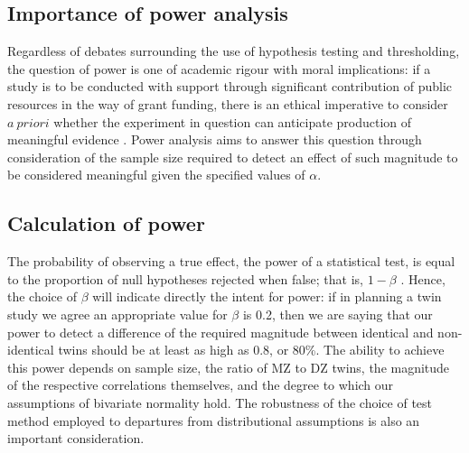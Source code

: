 \subsection{Importance of power analysis}
Regardless of debates surrounding the use of hypothesis testing and thresholding, the question of power is one of academic rigour with moral implications: if a study is to be conducted with support through significant contribution of public resources in the way of grant funding, there is an ethical imperative to consider $a \ priori$ whether the experiment in question can anticipate production of meaningful evidence \cite{Freiman1978,Cohen1988}.  Power analysis aims to answer this question through consideration of the sample size required to detect an effect of such magnitude to be considered meaningful given the specified values of $\alpha$.  

\subsection{Calculation of power}
The probability of observing a true effect, the power of a statistical test, is equal to the proportion of null hypotheses rejected when false; that is, $1 - \beta$ \cite{Cohen1988}.  Hence, the choice of $\beta$ will indicate directly the intent for power: if in planning a twin study we agree an appropriate value for $\beta$ is 0.2, then we are saying that our power to detect a difference of the required magnitude between identical and non-identical twins should be at least as high as 0.8, or 80\%. The ability to achieve this power depends on sample size, the ratio of MZ to DZ twins, the magnitude of the respective correlations themselves, and the degree to which our assumptions of bivariate normality hold. The robustness of the choice of test method employed to departures from distributional assumptions is also an important consideration.
